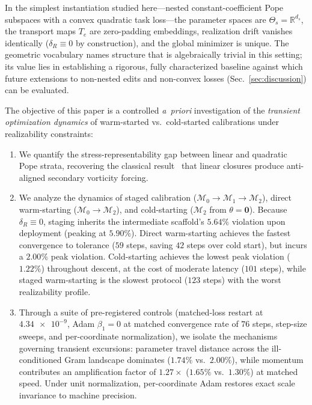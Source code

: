 \documentclass[preprint,aps,prb,longbibliography,superscriptaddress]{revtex4-2}
\newcommand{\dR}{\delta_R}
\begin{document}
In the simplest instantiation studied here---nested constant-coefficient Pope
subspaces with a convex quadratic task loss---the parameter spaces are
$\Theta_s = \mathbb{R}^{d_s}$, the transport maps $T_e$ are zero-padding
embeddings, realization drift vanishes identically ($\dR \equiv 0$ by
construction), and the global minimizer is unique. The geometric vocabulary
names structure that is algebraically trivial in this setting; its value lies
in establishing a rigorous, fully characterized baseline against which future
extensions to non-nested edits and non-convex losses (Sec.~\ref{sec:discussion})
can be evaluated.

The objective of this paper is a controlled \emph{a~priori} investigation of
the \emph{transient optimization dynamics} of warm-started vs.\ cold-started
calibrations under realizability constraints:
\begin{enumerate}
  \item We quantify the stress-representability gap between linear and
    quadratic Pope strata, recovering the classical result~\cite{Speziale1987}
    that linear closures produce anti-aligned secondary vorticity forcing.
  \item We analyze the dynamics of staged calibration ($\mathcal{M}_0 \to
    \mathcal{M}_1 \to \mathcal{M}_2$), direct warm-starting ($\mathcal{M}_0 \to
    \mathcal{M}_2$), and cold-starting ($\mathcal{M}_2$ from $\theta = \mathbf{0}$).
    Because $\delta_R \equiv 0$, staging inherits the intermediate scaffold's
    $5.64\%$ violation upon deployment (peaking at $5.90\%$). Direct warm-starting
    achieves the fastest convergence to tolerance ($59$ steps, saving $42$ steps
    over cold start), but incurs a $2.00\%$ peak violation. Cold-starting achieves
    the lowest peak violation ($1.22\%$) throughout descent, at the cost of
    moderate latency ($101$ steps), while staged warm-starting is the slowest
    protocol ($123$ steps) with the worst realizability profile.
  \item Through a suite of pre-registered controls (matched-loss restart at
    $\num{4.34e-9}$, Adam $\beta_1 = 0$ at matched convergence rate of $76$ steps,
    step-size sweeps, and per-coordinate normalization), we isolate the mechanisms
    governing transient excursions: parameter travel distance across the ill-conditioned
    Gram landscape dominates ($1.74\%$ vs.\ $2.00\%$), while momentum contributes
    an amplification factor of $1.27\times$ ($1.65\%$ vs.\ $1.30\%$) at matched speed.
    Under unit normalization, per-coordinate Adam restores exact scale invariance to
    machine precision.
\end{enumerate}
\end{document}
